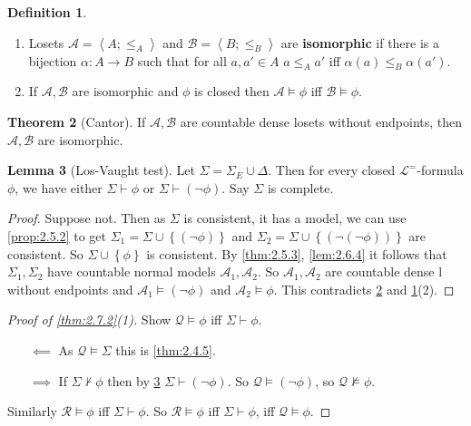 \documentclass{article}
\newcommand{\A}{\mathcal{A}}
\renewcommand{\L}{\mathcal{L}}
\newcommand{\rb}[1]{\left( #1 \right)}
\newcommand{\cb}[1]{\left\{ #1 \right\}}
\newcommand{\ab}[1]{\left\langle #1 \right\rangle}
\newcommand{\notb}[1]{\rb{\neg #1}}
\theoremstyle{definition}\newtheorem{definition}{Definition}[subsection]
\theoremstyle{definition}\newtheorem{remark}[definition]{Remark}
\theoremstyle{definition}\newtheorem*{example}{Example}
\theoremstyle{definition}\newtheorem*{note}{Note}
\newtheorem{lemma}[definition]{Lemma}
\newtheorem{theorem}[definition]{Theorem}
\begin{document}
\begin{definition}
\label{def:2.7.3}
\hfill
\begin{enumerate}
\item Losets $ \A = \ab{A; \le_A} $ and $ \mathcal{B} = \ab{B; \le_B} $ are \textbf{isomorphic} if there is a bijection $ \alpha : A \to B $ such that for all $ a, a' \in A $ $ a \le_A a' $ iff $ \alpha\rb{a} \le_B \alpha\rb{a'} $.
\item If $ \A, \mathcal{B} $ are isomorphic and $ \phi $ is closed then $ \A \vDash \phi $ iff $ \mathcal{B} \vDash \phi $.
\end{enumerate}
\end{definition}

\begin{theorem}[Cantor]
\label{thm:2.7.4}
If $ \A, \mathcal{B} $ are countable dense losets without endpoints, then $ \A, \mathcal{B} $ are isomorphic.
\end{theorem}

\begin{lemma}[Los-Vaught test]
\label{lem:2.7.5}
Let $ \Sigma = \Sigma_E \cup \Delta $. Then for every closed $ \L^= $-formula $ \phi $, we have either $ \Sigma \vdash \phi $ or $ \Sigma \vdash \notb{\phi} $. Say $ \Sigma $ is complete.
\end{lemma}

\begin{proof}
Suppose not. Then as $ \Sigma $ is consistent, it has a model, we can use \ref{prop:2.5.2} to get $ \Sigma_1 = \Sigma \cup \cb{\notb{\phi}} $ and $ \Sigma_2 = \Sigma \cup \cb{\notb{\notb{\phi}}} $ are consistent. So $ \Sigma \cup \cb{\phi} $ is consistent. By \ref{thm:2.5.3}, \ref{lem:2.6.4} it follows that $ \Sigma_1, \Sigma_2 $ have countable normal models $ \A_1, \A_2 $. So $ \A_1, \A_2 $ are countable dense l without endpoints and $ \A_1 \vDash \notb{\phi} $ and $ \A_2 \vDash \phi $. This contradicts \ref{thm:2.7.4} and \ref{def:2.7.3}(2).
\end{proof}

\begin{proof}[Proof of \ref{thm:2.7.2}(1)]
Show $ \mathcal{Q} \vDash \phi $ iff $ \Sigma \vdash \phi $.
\begin{itemize}
\item[$ \impliedby $] As $ \mathcal{Q} \vDash \Sigma $ this is \ref{thm:2.4.5}.
\item[$ \implies $] If $ \Sigma \not\vdash \phi $ then by \ref{lem:2.7.5} $ \Sigma \vdash \notb{\phi} $. So $ \mathcal{Q} \vDash \notb{\phi} $, so $ \mathcal{Q} \not\vDash \phi $.
\end{itemize}
Similarly $ \mathcal{R} \vDash \phi $ iff $ \Sigma \vdash \phi $. So $ \mathcal{R} \vDash \phi $ iff $ \Sigma \vdash \phi $, iff $ \mathcal{Q} \vDash \phi $.
\end{proof}
\end{document}
